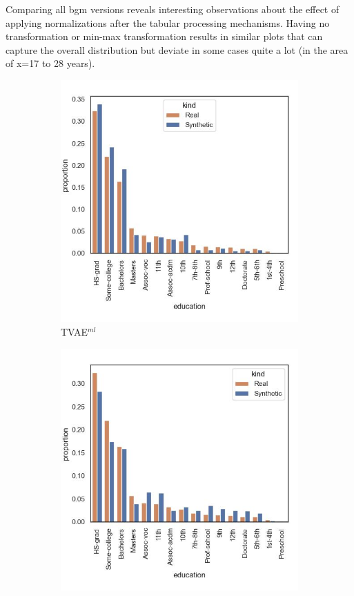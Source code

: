 Comparing all \gls{bgm} versions reveals interesting observations about the effect of applying normalizations after the tabular processing mechanisms.
Having no transformation or min-max transformation results in similar plots that can capture the overall distribution but deviate in some cases quite a lot (in the area of x=17 to 28 years).\newpage

\begin{figure}[H]
	\centering
	\begin{subfigure}{0.3\textwidth}
		\centering
		\includegraphics[width=\textwidth]{images/dist_education/tvae.jpg}
		\caption{TVAE$^{ml}$}
	\end{subfigure}
	\begin{subfigure}{0.3\textwidth}
		\centering
		\includegraphics[width=\textwidth]{images/dist_education/ctabgan.jpg}

\end{subfigure}
\end{figure}
